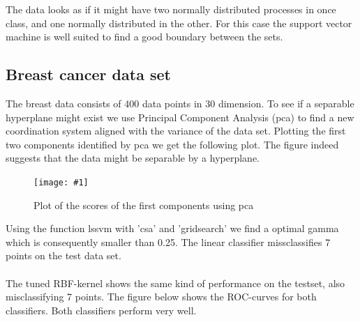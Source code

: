\documentclass[•]{article}
\newcommand{\apicture}[2] {
  \begin{figure}[H]
  \centering
  \texttt{[image: \#1]}
  \caption{#2}
  \end{figure}
  }
\begin{document}
The data looks as if it might have two normally distributed processes in once class, and one normally distributed in the other. For this case the support vector machine is well suited to find a good boundary between the sets.

\subsection{Breast cancer data set}
The breast data consists of 400 data points in 30 dimension. To see if a separable hyperplane might exist we use Principal Component Analysis (pca) to find a new coordination system aligned with the variance of the data set. Plotting the first two components identified by pca we get the following plot. The figure indeed suggests that the data might be separable by a hyperplane. 

\apicture{pcaplotbreast.jpg}{Plot of the scores of the first components using pca}

Using the function lssvm with 'csa' and 'gridsearch' we find a optimal gamma which is consequently smaller than 0.25. The linear classifier missclassifies 7 points on the test data set.
\\\\
The tuned RBF-kernel shows the same kind of performance on the testset, also misclassifying 7 points. The figure below shows the ROC-curves for both classifiers. Both classifiers perform very well. 
\end{document}
